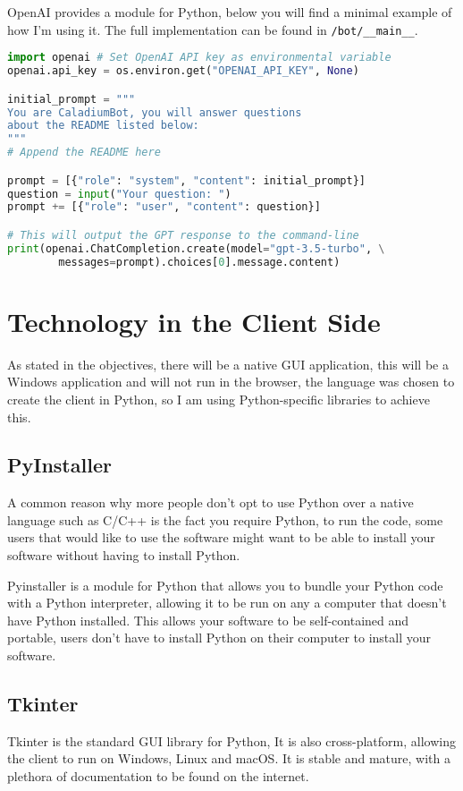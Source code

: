 OpenAI provides a module for Python,
below you will find a minimal example of how I'm using it.
The full implementation can be found in \texttt{/bot/\_\_main\_\_}.

\begin{lstlisting}[language=Python]
import openai # Set OpenAI API key as environmental variable
openai.api_key = os.environ.get("OPENAI_API_KEY", None)

initial_prompt = """
You are CaladiumBot, you will answer questions
about the README listed below:
"""
# Append the README here

prompt = [{"role": "system", "content": initial_prompt}]
question = input("Your question: ")
prompt += [{"role": "user", "content": question}]

# This will output the GPT response to the command-line
print(openai.ChatCompletion.create(model="gpt-3.5-turbo", \
        messages=prompt).choices[0].message.content)
\end{lstlisting}

\section{Technology in the Client Side}
As stated in the objectives, there will be a native GUI application,
this will be a Windows application and will not run in the browser,
the language was chosen to create the client in Python,
so I am using Python-specific libraries to achieve this.

\subsection{PyInstaller}
A common reason why more people don't opt to use Python over a
native language such as C/C++ is the fact you require Python,
to run the code, some users that would like to use the software might 
want to be able to install your software without having to install Python.

Pyinstaller is a module for Python that allows you to bundle your
Python code with a Python interpreter, allowing it to be run on any
a computer that doesn't have Python installed.
This allows your software to be self-contained and portable,
users don't have to install Python on their computer to install your software.

\subsection{Tkinter}
Tkinter is the standard GUI library for Python,
It is also cross-platform, allowing the client to run on Windows, Linux and macOS.
It is stable and mature, with a plethora of documentation to be found on the internet.

